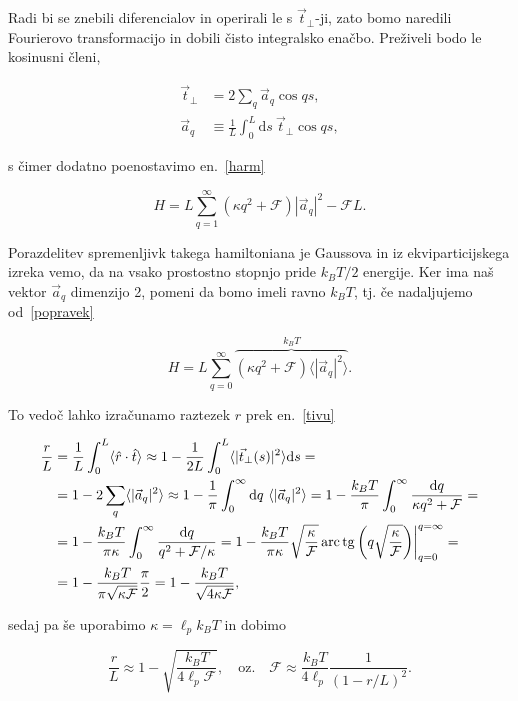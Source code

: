 \documentclass[12pt, a4 paper]{article}
\renewcommand{\t}{
	\ensuremath{\hat{t}}
}
\renewcommand{\d}{
	\ensuremath{\mathrm{d}}
}
\newcommand{\tp}{
	\ensuremath{\vec{t}_\perp}
}
\newcommand{\F}{
	\ensuremath{\mathcal{F}}
}
\newcommand{\arctg}{
	\operatorname{arc\,tg}
}
\begin{document}
Radi bi se znebili diferencialov in operirali le s $\tp$-ji, zato bomo naredili Fourierovo transformacijo
in dobili \v cisto integralsko ena\v cbo. Pre\v ziveli bodo le kosinusni \v cleni,

\begin{align}
	\tp &= 2\sum_q \vec{a}_q\cos qs, \\
	\vec{a}_q &\equiv \frac{1}{L}\int_0^L\d s\ \tp \cos qs,
\end{align}

s \v cimer dodatno poenostavimo en.~\eqref{harm}

\begin{equation}
	H = L\sum_{q = 1}^{\infty} (\kappa q^2 + \F)|\vec{a}_q|^2 - \F L.
	\label{popravek}
\end{equation}

Porazdelitev spremenljivk takega hamiltoniana je Gaussova in iz ekviparticijskega izreka vemo, da na vsako
prostostno stopnjo pride $k_B T/2$ energije. Ker ima na\v s vektor $\vec{a}_q$ dimenzijo 2, pomeni da bomo
imeli ravno $k_B T$, tj. \v ce nadaljujemo od~\eqref{popravek}

\begin{equation}
	H = L \sum_{q = 0}^\infty \overbrace{(\kappa q^2 + \F)\langle|\vec{a}_q|^2\rangle}^{k_B T}.
\end{equation}

To vedo\v c lahko izra\v cunamo raztezek $r$ prek en.~\eqref{tivu}

\begin{align}
	\frac{r}{L} &= \frac{1}{L}\int_0^L \langle\hat{r}\cdot\t\rangle \approx
		1 - \frac{1}{2L}\int_0^L \langle|\tp(s)|^2\rangle \d s = \notag \\
	&= 1 - 2\sum_q \langle|\vec{a}_q|^2\rangle \approx 1 -\frac{1}{\pi}\int_0^\infty \d q\ \langle|\vec{a}_q|^2
		\rangle = 1 - \frac{k_B T}{\pi}\int_0^\infty \frac{\d q}{\kappa q^2 + \F} = \notag \\
	&= 1 - \frac{k_B T}{\pi\kappa}\int_0^\infty\frac{\d q}{q^2 + \F/\kappa} =
		1 - \frac{k_B T}{\pi\kappa}\sqrt{\frac{\kappa}{\F}}\arctg\bigg(q\sqrt{\frac{\kappa}{\F}}\bigg)
		\bigg|_{q = 0}^{q = \infty} = \notag \\
	&= 1 - \frac{k_B T}{\pi\sqrt{\kappa\F}}\frac{\pi}{2} = 1 - \frac{k_B T}{\sqrt{4\kappa\F}},
\end{align}

sedaj pa \v se uporabimo $\kappa = \ell_p k_B T$ in dobimo

\begin{equation}
	\frac{r}{L} \approx 1 - \sqrt{\frac{k_B T}{4\ell_p \F}}, \quad \text{oz.} \quad
	\F \approx \frac{k_B T}{4\ell_p}\frac{1}{(1 - r/L)^2}.
\end{equation}
\end{document}
